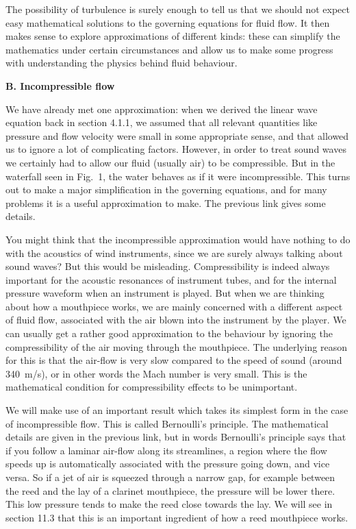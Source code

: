   The possibility of turbulence is surely enough to tell us that we should not 
  expect easy mathematical solutions to the governing equations for fluid flow. 
  It then makes sense to explore approximations of different kinds: these can 
  simplify the mathematics under certain circumstances and allow us to make 
  some progress with understanding the physics behind fluid behaviour. 

  \textbf{B. Incompressible flow} 

  We have already met one approximation: when we derived the linear wave 
  equation back in section 4.1.1, we assumed that all relevant quantities like 
  pressure and flow velocity were small in some appropriate sense, and that 
  allowed us to ignore a lot of complicating factors. However, in order to 
  treat sound waves we certainly had to allow our fluid (usually air) to be 
  compressible. But in the waterfall seen in Fig.\ 1, the water behaves as if 
  it were incompressible. This turns out to make a major simplification in the 
  governing equations, and for many problems it is a useful approximation to 
  make. The previous link gives some details. 

  You might think that the incompressible approximation would have nothing to 
  do with the acoustics of wind instruments, since we are surely always talking 
  about sound waves? But this would be misleading. Compressibility is indeed 
  always important for the acoustic resonances of instrument tubes, and for the 
  internal pressure waveform when an instrument is played. But when we are 
  thinking about how a mouthpiece works, we are mainly concerned with a 
  different aspect of fluid flow, associated with the air blown into the 
  instrument by the player. We can usually get a rather good approximation to 
  the behaviour by ignoring the compressibility of the air moving through the 
  mouthpiece. The underlying reason for this is that the air-flow is very slow 
  compared to the speed of sound (around 340~m/s), or in other words the Mach 
  number is very small. This is the mathematical condition for compressibility 
  effects to be unimportant. 

  We will make use of an important result which takes its simplest form in the 
  case of incompressible flow. This is called Bernoulli’s principle. The 
  mathematical details are given in the previous link, but in words Bernoulli’s 
  principle says that if you follow a laminar air-flow along its streamlines, a 
  region where the flow speeds up is automatically associated with the pressure 
  going down, and vice versa. So if a jet of air is squeezed through a narrow 
  gap, for example between the reed and the lay of a clarinet mouthpiece, the 
  pressure will be lower there. This low pressure tends to make the reed close 
  towards the lay. We will see in section 11.3 that this is an important 
  ingredient of how a reed mouthpiece works. 

